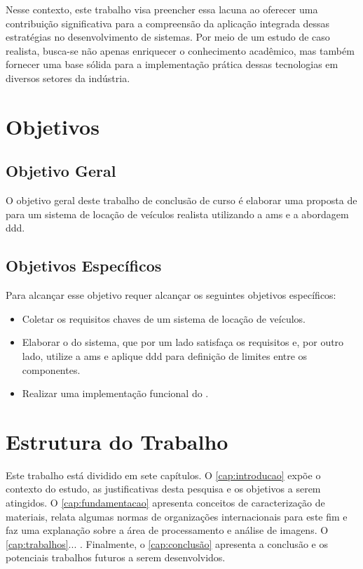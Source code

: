 Nesse contexto, este trabalho visa preencher essa lacuna ao oferecer uma contribuição significativa para a compreensão da aplicação integrada dessas estratégias no desenvolvimento de sistemas. Por meio de um estudo de caso realista, busca-se não apenas enriquecer o conhecimento acadêmico, mas também fornecer uma base sólida para a implementação prática dessas tecnologias em diversos setores da indústria.

\section{Objetivos}

\subsection{Objetivo Geral}
O objetivo geral deste trabalho de conclusão de curso é elaborar uma proposta de  para um sistema de locação de veículos realista utilizando a \acrfull{ams} e a abordagem \acrfull{ddd}.

\subsection{Objetivos Específicos}
Para alcançar esse objetivo requer alcançar os seguintes objetivos específicos:

\begin{itemize}
\item Coletar os requisitos chaves de um sistema de locação de veículos.
\item Elaborar o  do sistema, que por um lado satisfaça os requisitos e, por outro lado, utilize a \acrshort{ams} e aplique \acrshort{ddd} para definição de limites entre os componentes.
\item Realizar uma implementação funcional do .
\end{itemize}

\section{Estrutura do Trabalho}

Este trabalho está dividido em sete capítulos.  O \autoref{cap:introducao} expõe o contexto do estudo, as justificativas desta pesquisa e os objetivos a serem atingidos. O \autoref{cap:fundamentacao} apresenta conceitos de caracterização de materiais, relata algumas normas de organizações internacionais para este fim e faz uma explanação sobre a área de processamento e análise de imagens. O \autoref{cap:trabalhos}... . Finalmente, o \autoref{cap:conclusão} apresenta a conclusão e os potenciais trabalhos futuros a serem desenvolvidos.